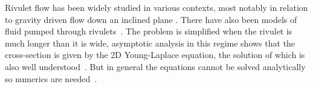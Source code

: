 \documentclass[a4paper]{article}
\begin{document}
 
Rivulet flow has been widely studied  in various  contexts, most notably in relation to gravity driven flow down  an inclined plane . 
There have also been models of fluid pumped through rivulets~\cite{SvetlichnayaStudyMinichannels}.
The problem is simplified when the rivulet  is much longer than it is wide, asymptotic analysis in this regime shows that the  cross-section is given by  the 2D Young-Laplace equation, the solution of which is also well understood~\cite{Sumesh2010TheDrops}. 
But in general the equations cannot  be solved analytically  so numerics are needed~\cite{Perazzo2004Navier-StokesPlane}.
 
  

 

 
 
  
\end{document}

